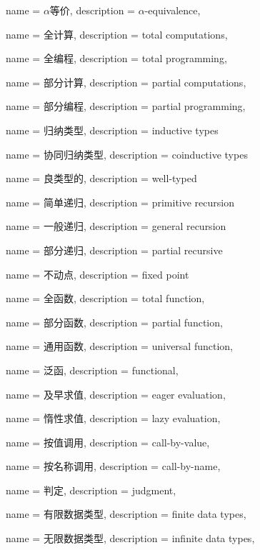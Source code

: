 
{
    name = $\alpha$等价,
    description = {$\alpha$-equivalence},
}

{
	name = 全计算,
	description = {total computations},
}

{
	name = 全编程,
	description = {total programming},
}

{
	name = 部分计算,
	description = {partial computations},
}

{
	name = 部分编程,
	description = {partial programming},
}

{
	name = 归纳类型,
	description = {inductive types}
}

{
	name = 协同归纳类型,
	description = {coinductive types}
}

{
	name = 良类型的,
	description = {well-typed}
}

{
	name = 简单递归,
	description = {primitive recursion}
}


{
	name = 一般递归,
	description = {general recursion}
}

{
	name = 部分递归,
	description = {partial recursive}
}

{
	name = 不动点,
	description = {fixed point}
}

{
	name = 全函数,
	description = {total function},
}


{
	name = 部分函数,
	description = {partial function},
}

{
	name = 通用函数,
	description = {universal function},
}


{
	name = 泛函,
	description = {functional},
}

{
	name = 及早求值,
	description = {eager evaluation},
}


{
	name = 惰性求值,
	description = {lazy evaluation},
}

{
	name = 按值调用,
	description = {call-by-value},
}


{
	name = 按名称调用,
	description = {call-by-name},
}

{
	name = 判定,
	description = {judgment},
}

{
	name = 有限数据类型,
	description = {finite data types},
}


{
	name = 无限数据类型,
	description = {infinite data types},
}

